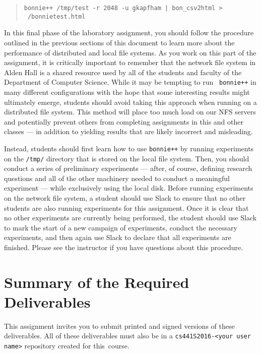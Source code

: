 \vspace*{-.1in}
\begin{quote}
  {\tt bonnie++ /tmp/test -r 2048 -u gkapfham | bon\_csv2html > ~/bonnietest.html}
\end{quote}
\vspace*{-.1in}

In this final phase of the laboratory assignment, you should follow the procedure outlined in the previous sections of
this document to learn more about the performance of distributed and local file systems. As you work on this part of the
assignment, it is critically important to remember that the network file system in Alden Hall is a shared resource used
by all of the students and faculty of the Department of Computer Science. While it may be tempting to run {\tt
bonnie++} in many different configurations with the hope that some interesting results might ultimately emerge, students
should avoid taking this approach when running on a distributed file system. This method will place too much load on our
NFS servers and potentially prevent others from completing assignments in this and other classes --- in addition to
yielding results that are likely incorrect and misleading.

Instead, students should first learn how to use {\tt bonnie++} by running experiments on the {\tt /tmp/} directory that
is stored on the local file system. Then, you should conduct a series of preliminary experiments --- after, of course,
defining research questions and all of the other machinery needed to conduct a meaningful experiment --- while
exclusively using the local disk. Before running experiments on the network file system, a student should use Slack to
ensure that no other students are also running experiments for this assignment. Once it is clear that no other
experiments are currently being performed, the student should use Slack to mark the start of a new campaign of
experiments, conduct the necessary experiments, and then again use Slack to declare that all experiments are finished.
Please see the instructor if you have questions about this procedure.

\section*{Summary of the Required Deliverables}

This assignment invites you to submit printed and signed versions of these deliverables. All of these deliverables must
also be in a {\tt cs441S2016-<your user name>} repository created for \mbox{this course}.

